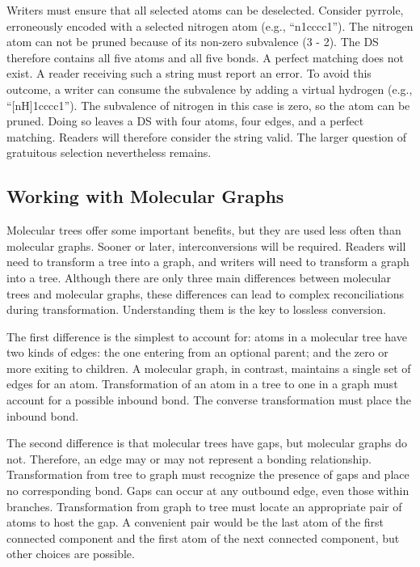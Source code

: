 \documentclass{article}
\begin{document}
Writers must ensure that all selected atoms can be deselected. Consider pyrrole, erroneously encoded with a selected nitrogen atom (e.g., \enquote{n1cccc1}). The nitrogen atom can not be pruned because of its non-zero subvalence (3 - 2). The DS therefore contains all five atoms and all five bonds. A perfect matching does not exist. A reader receiving such a string must report an error. To avoid this outcome, a writer can consume the subvalence by adding a virtual hydrogen (e.g., \enquote{[nH]1cccc1}). The subvalence of nitrogen in this case is zero, so the atom can be pruned. Doing so leaves a DS with four atoms, four edges, and a perfect matching. Readers will therefore consider the string valid. The larger question of gratuitous selection nevertheless remains.

\subsection*{Working with Molecular Graphs}
\label{working-with-molecular-graphs}

Molecular trees offer some important benefits, but they are used less often than molecular graphs. Sooner or later, interconversions will be required. Readers will need to transform a tree into a graph, and writers will need to transform a graph into a tree. Although there are only three main differences between molecular trees and molecular graphs, these differences can lead to complex reconciliations during transformation. Understanding them is the key to lossless conversion.

The first difference is the simplest to account for: atoms in a molecular tree have two kinds of edges: the one entering from an optional parent; and the zero or more exiting to children. A molecular graph, in contrast, maintains a single set of edges for an atom. Transformation of an atom in a tree to one in a graph must account for a possible inbound bond. The converse transformation must place the inbound bond.

The second difference is that molecular trees have gaps, but molecular graphs do not. Therefore, an edge may or may not represent a bonding relationship. Transformation from tree to graph must recognize the presence of gaps and place no corresponding bond. Gaps can occur at any outbound edge, even those within branches. Transformation from graph to tree must locate an appropriate pair of atoms to host the gap. A convenient pair would be the last atom of the first connected component and the first atom of the next connected component, but other choices are possible.
\end{document}
